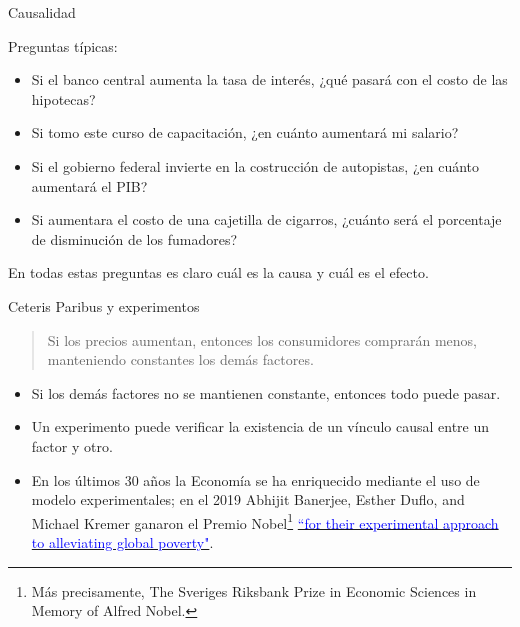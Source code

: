 \documentclass[11pt,handout]{beamer}
\begin{document}
\begin{frame}
{Causalidad}

Preguntas típicas: 
\pause 
\begin{itemize}[<+->]
	\item Si el banco central aumenta la tasa de interés, ¿qué pasará con el costo de las hipotecas? 
	\item Si tomo este curso de capacitación, ¿en cuánto aumentará mi salario?
	\item Si el gobierno federal invierte en la costrucción de autopistas, ¿en cuánto aumentará el PIB?
	\item Si aumentara el costo de una cajetilla de cigarros, ¿cuánto será el porcentaje de disminución de los fumadores?
\end{itemize}
\pause 
En todas estas preguntas es claro cuál es la causa y cuál es el efecto. 

\end{frame}

\begin{frame}
{Ceteris Paribus y experimentos}

\pause 
\begin{quote}
	Si los precios aumentan, entonces los consumidores comprarán menos, \alert{manteniendo constantes los demás factores.} 
\end{quote}
\pause 

\begin{itemize}
	\item Si los demás factores no se mantienen constante, entonces todo puede pasar. 

	\item Un experimento puede verificar la existencia de un vínculo causal entre un factor y otro. 

	\item En los últimos 30 años la Economía se ha enriquecido mediante el uso de modelo experimentales; en el 2019 Abhijit Banerjee, Esther Duflo, and Michael Kremer ganaron el Premio Nobel\footnote{Más precisamente, The Sveriges Riksbank Prize in Economic Sciences in Memory of Alfred Nobel.}
	\href{https://www.nobelprize.org/prizes/economic-sciences/2019/press-release/}{\textcolor{blue}{“for their experimental approach to alleviating global poverty"}}.
\end{itemize}
\end{frame}
\end{document}
